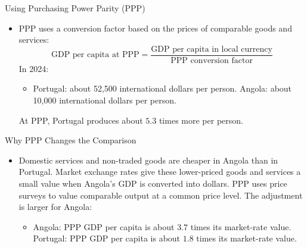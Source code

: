 \documentclass[10pt,aspectratio=169]{beamer}
\begin{document}
\begin{frame}{Using Purchasing Power Parity (PPP)}

\begin{itemize}
    \item PPP uses a conversion factor based on the prices of comparable goods
    and services:
    \[
        \text{GDP per capita at PPP}
        =
        \frac{\text{GDP per capita in local currency}}
        {\text{PPP conversion factor}}
    \]
    \itemvso In 2024:
    \begin{itemize}
        \item Portugal: about 52,500 international dollars per person.
        \itemvso Angola: about 10,000 international dollars per person.
    \end{itemize}
    \itemvso At PPP, Portugal produces about \(5.3\) times more per person.
\end{itemize}


\end{frame}

\begin{frame}{Why PPP Changes the Comparison}

\begin{itemize}
    \item Domestic services and non-traded goods are cheaper in
    Angola than in Portugal.
    \itemvso Market exchange rates give these lower-priced goods and services
    a small value when Angola's GDP is converted into dollars.
    \itemvso PPP uses price surveys to value comparable output at a common
    price level.
    \itemvso The adjustment is larger for Angola:
    \begin{itemize}
        \item Angola: PPP GDP per capita is about \(3.7\) times its
        market-rate value.
        \itemvso Portugal: PPP GDP per capita is about \(1.8\) times its
        market-rate value.
    \end{itemize}
\end{itemize}

\end{frame}
\end{document}
